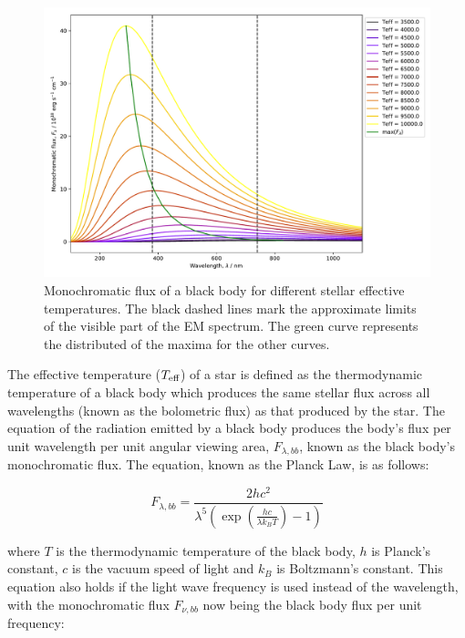 \documentclass[12pt, a4paper]{report}
\begin{document}
\begin{figure}[h]
\begin{center}
\includegraphics[scale=0.5]{blackbody_teff_illustration.pdf}
\caption{Monochromatic flux of a black body for different stellar effective temperatures. The black dashed lines mark the approximate limits of the visible part of the EM spectrum. The green curve represents the distributed of the maxima for the other curves.}
\label{planck_curve}
\end{center}
\end{figure}

The effective temperature ($T_{\textnormal{eff}}$) of a star is defined as the thermodynamic temperature of a black body which produces the same stellar flux across all wavelengths (known as the bolometric flux) as that produced by the star. The equation of the radiation emitted by a black body produces the body's flux per unit wavelength per unit angular viewing area, $F_{\lambda,bb}$, known as the black body's monochromatic flux. The equation, known as the Planck Law, is as follows:


\begin{equation}
F_{\lambda,bb} = \frac{2hc^{2}}{\lambda^{5}\left(\exp\left({\frac{hc}{\lambda k_{B}T}}\right) - 1\right)}
\label{planck_bb}
\end{equation} 

where $T$ is the thermodynamic temperature of the black body, $h$ is Planck's constant, $c$ is the vacuum speed of light and $k_{B}$ is Boltzmann's constant. This equation also holds if the light wave frequency is used instead of the wavelength, with the monochromatic flux $F_{\nu,bb}$ now being the black body flux per unit frequency:
\end{document}
